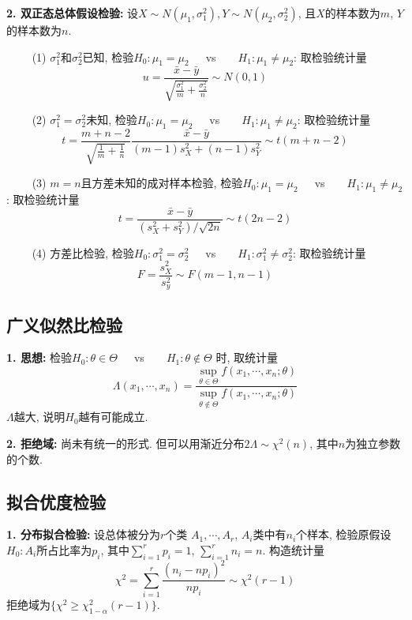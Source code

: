 \textbf{2. 双正态总体假设检验: }设$X\sim N(\mu_1,\sigma_1^2), Y\sim N(\mu_2,\sigma_2^2)$, 且$X$的样本数为$m$, $Y$的样本数为$n$.

~~~~ (1) $\sigma_1^2$和$\sigma_2^2$已知, 检验$H_0:\mu_1 =\mu_2$~~~vs~~~~$H_1:\mu_1 \neq \mu_2$: 取检验统计量
\begin{equation*}
    u=\frac{\bar{x}-\bar{y}}{\sqrt{\frac{\sigma_1^2}{m}+\frac{\sigma_2^2}{n}}} \sim N(0,1)
\end{equation*}

~~~~ (2) $\sigma_1^2=\sigma_2^2$未知, 检验$H_0:\mu_1 =\mu_2$~~~vs~~~~$H_1:\mu_1 \neq \mu_2$: 取检验统计量
\begin{equation*}
    t=\frac{m+n-2}{\sqrt{\frac{1}{m}+\frac{1}{n}}}\frac{\bar{x}-\bar{y}}{(m-1)s_X^2+(n-1)s_Y^2} \sim t(m+n-2)
\end{equation*}

~~~~ (3) $m=n$且方差未知的成对样本检验, 检验$H_0:\mu_1 =\mu_2$~~~vs~~~~$H_1:\mu_1 \neq \mu_2$: 取检验统计量
\begin{equation*}
    t=\frac{\bar{x}-\bar{y}}{(s_X^2+s_Y^2)/\sqrt{2n}} \sim t(2n-2)
\end{equation*}

~~~~ (4) 方差比检验, 检验$H_0:\sigma_1^2 =\sigma_2^2$~~~vs~~~~$H_1:\sigma_1^2 \neq \sigma_2^2$: 取检验统计量
\begin{equation*}
    F=\frac{s_X^2}{s_y^2} \sim F(m-1,n-1)
\end{equation*}

\subsection{广义似然比检验}

\textbf{1. 思想: }检验$H_0:\theta \in \Theta$~~~vs~~~~$H_1:\theta \notin \Theta$ 时, 取统计量
\begin{equation*}
    \Lambda(x_1,\cdots,x_n)=\frac{\sup\limits_{\theta \in \Theta} f(x_1,\cdots,x_n;\theta)}{\sup\limits_{\theta \notin \Theta} f(x_1,\cdots,x_n;\theta)}
\end{equation*}
$\Lambda$越大, 说明$H_0$越有可能成立.

\textbf{2. 拒绝域:} 尚未有统一的形式. 但可以用渐近分布$2\Lambda \sim \chi^2(n)$, 其中$n$为独立参数的个数.

\subsection{拟合优度检验}

\textbf{1. 分布拟合检验: }设总体被分为$r$个类 $A_1,\cdots,A_r$, $A_i$类中有$n_i$个样本, 检验原假设$H_0:A_i$所占比率为$p_i$, 其中$\sum\limits_{i=1}^r p_i=1$, $\sum\limits_{i=1}^r n_i=n$. 构造统计量
\begin{equation*}
    \chi^2=\sum\limits_{i=1}^r \frac{(n_i-np_i)^2}{np_i} \sim \chi^2(r-1)
\end{equation*}
拒绝域为$\{\chi^2 \geq \chi^2_{1-\alpha}(r-1)\}$.

